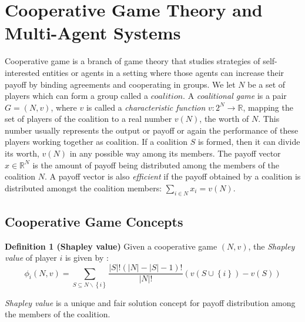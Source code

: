 \section{Cooperative Game Theory and Multi-Agent Systems}\label{sec:CGTMS}


Cooperative game is a branch of game theory that studies
strategies of self-interested entities or agents in a setting
where those agents can increase their payoff by binding agreements
and cooperating in groups. We let $N$ be a set of players which
can form a group called a $coalition$. A \emph{coalitional game}
is a pair $G = (N, v)$, where $v$ is called a \emph{characteristic
function} $v: 2^N \to \mathbb{R}$, mapping the set of players of
the coalition to a real number $v(N)$, the worth of $N$. This
number usually represents the output or payoff or again the
performance of these players working together as coalition. If a
coalition $S$ is formed, then it can divide its worth, $v(N)$ in
any possible way among its members. The payoff vector $x \in
\mathbb{R}^N$ is the amount of payoff being distributed among the
members of the coalition $N$.  A payoff vector is also \emph{efficient}
if the payoff obtained by a coalition is distributed amongst the
coalition members: $\sum_{i \in N} x_i = v(N)$.


        \subsection{Cooperative Game Concepts}


            {\bf Definition 1 (Shapley value)} Given a cooperative game $(N,
            v)$, the \emph{Shapley value} of player $i$ is given by \cite{shapley_value}:
            \begin{equation}\label{eq:shapley}
            \phi_i(N,v) = \sum_{S \subseteq N \backslash \left\{i\right\} }
            \frac{|S|! (|N|-|S|-1)!}{|N|!} (v(S \cup \left\{i\right\}) - v(S))
            \end{equation}

            \emph{Shapley value} is a unique and fair solution concept for
            payoff distribution among the members of the coalition.

